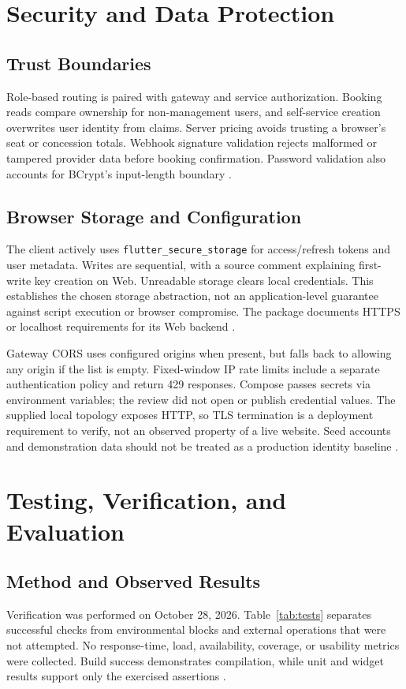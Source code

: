 \documentclass[conference]{IEEEtran}
\newcommand{\code}[1]{\texttt{#1}}
\begin{document}
\section{Security and Data Protection}
\subsection{Trust Boundaries}
Role-based routing is paired with gateway and service authorization. Booking
reads compare ownership for non-management users, and self-service creation
overwrites user identity from claims. Server pricing avoids trusting a browser's
seat or concession totals. Webhook signature validation rejects malformed or
tampered provider data before booking confirmation. Password validation also
accounts for BCrypt's input-length boundary \cite{auth,gateway,booking}.

\subsection{Browser Storage and Configuration}
The client actively uses \code{flutter\_secure\_storage} for access/refresh
tokens and user metadata. Writes are sequential, with a source comment
explaining first-write key creation on Web. Unreadable storage clears local
credentials. This establishes the chosen storage abstraction, not an
application-level guarantee against script execution or browser compromise.
The package documents HTTPS or localhost requirements for its Web backend
\cite{client,storage}.

Gateway CORS uses configured origins when present, but falls back to allowing
any origin if the list is empty. Fixed-window IP rate limits include a separate
authentication policy and return 429 responses. Compose passes secrets via
environment variables; the review did not open or publish credential values.
The supplied local topology exposes HTTP, so TLS termination is a deployment
requirement to verify, not an observed property of a live website. Seed
accounts and demonstration data should not be treated as a production identity
baseline \cite{gateway,deployment,db}.

\section{Testing, Verification, and Evaluation}
\subsection{Method and Observed Results}
Verification was performed on October 28, 2026. Table~\ref{tab:tests} separates
successful checks from environmental blocks and external operations that were
not attempted. No response-time, load, availability, coverage, or usability
metrics were collected. Build success demonstrates compilation, while unit and
widget results support only the exercised assertions \cite{tests,fluttertest}.

\end{document}
